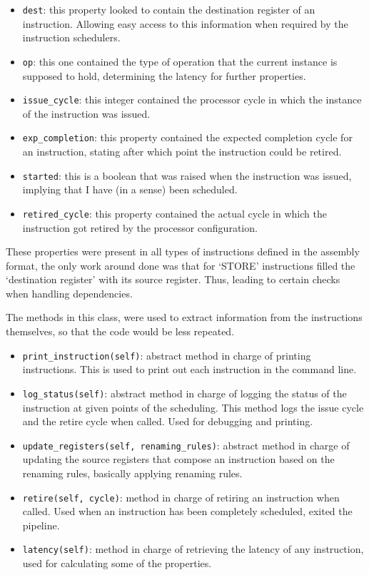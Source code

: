 \documentclass{article}
\begin{document}
\begin{itemize}
    \item \lstinline|dest|: this property looked to contain the destination register of an instruction. Allowing easy access to this information when required by the instruction schedulers.
    \item \lstinline|op|: this one contained the type of operation that the current instance is supposed to hold, determining the latency for further properties.
    \item \lstinline|issue_cycle|: this integer contained the processor cycle in which the instance of the instruction was issued.
    \item \lstinline|exp_completion|: this property contained the expected completion cycle for an instruction, stating after which point the instruction could be retired. 
    \item \lstinline|started|: this is a boolean that was raised when the instruction was issued, implying that I have (in a sense) been scheduled. 
    \item \lstinline|retired_cycle|: this property contained the actual cycle in which the instruction got retired by the processor configuration.
\end{itemize}

These properties were present in all types of instructions defined in the assembly format, the only work around done was that for `STORE' instructions filled the `destination register' with its source register. Thus, leading to certain checks when handling dependencies.

The methods in this class, were used to extract information from the instructions themselves, so that the code would be less repeated. 

\begin{itemize}
    \item \lstinline|print_instruction(self)|: abstract method in charge of printing instructions. This is used to print out each instruction in the command line.
    \item \lstinline|log_status(self)|: abstract method in charge of logging the status of the instruction at given points of the scheduling. This method logs the issue cycle and the retire cycle when called. Used for debugging and printing.
    \item \lstinline|update_registers(self, renaming_rules)|: abstract method in charge of updating the source registers that compose an instruction based on the renaming rules, basically applying renaming rules.
    \item \lstinline|retire(self, cycle)|: method in charge of retiring an instruction when called. Used when an instruction has been completely scheduled, exited the pipeline.
    \item \lstinline|latency(self)|: method in charge of retrieving the latency of any instruction, used for calculating some of the properties.
\end{itemize}
\end{document}
